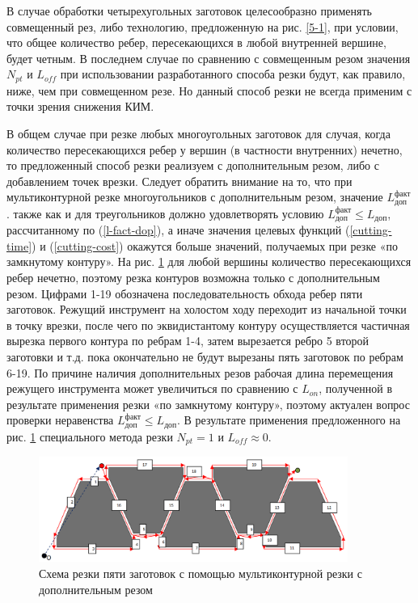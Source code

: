 \documentclass[12pt,twoside]{report}
\begin{document}
В случае обработки четырехугольных заготовок
целесообразно применять совмещенный рез,
либо технологию, предложенную на рис. \ref{5-1},
при условии, что общее количество ребер,
пересекающихся в любой внутренней вершине, будет четным.
В последнем случае по сравнению с совмещенным резом значения
$N_{pt}$
и $L_{off}$
при использовании разработанного способа резки будут,
как правило, ниже, чем при совмещенном резе.
Но данный способ резки не всегда применим
с точки зрения снижения КИМ.

В общем случае при резке любых многоугольных
заготовок для случая,
когда количество пересекающихся ребер у вершин
(в частности внутренних) нечетно,
то предложенный способ резки реализуем с
дополнительным резом, либо с добавлением точек врезки.
Следует обратить внимание на то,
что при мультиконтурной резке многоугольников с
дополнительным резом, значение
$L_\text{доп}^\text{факт}$.
также как и для треугольников должно удовлетворять условию
$L_\text{доп}^\text{факт} \leqslant L_\text{доп}$,
рассчитанному по (\ref{l-fact-dop}),
а иначе значения целевых функций (\ref{cutting-time})
и (\ref{cutting-cost})
окажутся больше значений,
получаемых  при резке «по замкнутому контуру».
На рис. \ref{5-extra}
для любой вершины количество пересекающихся ребер нечетно,
поэтому резка контуров возможна только с дополнительным резом.
Цифрами 1-19 обозначена последовательность обхода ребер
пяти заготовок.
Режущий инструмент на холостом ходу переходит
из начальной точки в точку врезки,
после чего по эквидистантому контуру
осуществляется частичная вырезка первого
контура по ребрам 1-4,
затем вырезается ребро 5 второй заготовки и т.д.
пока окончательно не будут вырезаны пять заготовок по ребрам 6-19.
По причине наличия дополнительных резов рабочая
длина перемещения режущего инструмента может увеличиться по сравнению с $L_{on}$,
полученной в результате применения резки «по замкнутому контуру»,
поэтому актуален вопрос проверки неравенства
$L_\text{доп}^\text{факт} \leqslant L_\text{доп}$.
В результате применения предложенного на рис. \ref{5-extra}
специального метода резки
$N_{pt}=1$
и $L_{off} \approx 0$.

\begin{figure}
  \begin{center}
  \includegraphics[width=0.9\textwidth]{5-extra.png}
  \caption{Схема резки пяти заготовок с помощью мультиконтурной резки с дополнительным резом}
  \label{5-extra}
  \end{center}
\end{figure}
\end{document}
